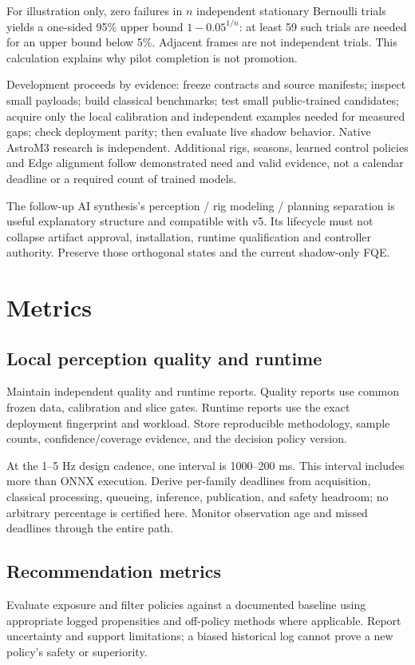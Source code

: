 \documentclass[11pt,a4paper]{article}
\begin{document}
For illustration only, zero failures in $n$ independent stationary Bernoulli
trials yields a one-sided 95\% upper bound $1-0.05^{1/n}$: at least 59 such trials
are needed for an upper bound below 5\%. Adjacent frames are not independent
trials. This calculation explains why pilot completion is not promotion.\cite{nistbinomial}

Development proceeds by evidence: freeze contracts and source manifests;
inspect small payloads; build classical benchmarks; test small public-trained
candidates; acquire only the local calibration and independent examples needed
for measured gaps; check deployment parity; then evaluate live shadow behavior.
Native AstroM3 research is independent. Additional rigs, seasons, learned
control policies and Edge alignment follow demonstrated need and valid evidence,
not a calendar deadline or a required count of trained models.

The follow-up AI synthesis's perception / rig modeling / planning separation
is useful explanatory structure and compatible with v5. Its lifecycle must not
collapse artifact approval, installation, runtime qualification and controller
authority. Preserve those orthogonal states and the current shadow-only FQE.


\section{Metrics}
\subsection{Local perception quality and runtime}
Maintain independent quality and runtime reports. Quality reports use common
frozen data, calibration and slice gates. Runtime reports use the exact
deployment fingerprint and workload. Store reproducible methodology, sample
counts, confidence/coverage evidence, and the decision policy version.

At the 1--5 Hz design cadence, one interval is 1000--200 ms. This interval
includes more than ONNX execution. Derive per-family deadlines from acquisition,
classical processing, queueing, inference, publication, and safety headroom;
no arbitrary percentage is certified here. Monitor observation age and missed
deadlines through the entire path.

\subsection{Recommendation metrics}
Evaluate exposure and filter policies against a documented baseline using
appropriate logged propensities and off-policy methods where applicable.
Report uncertainty and support limitations; a biased historical log cannot
prove a new policy's safety or superiority.
\end{document}
